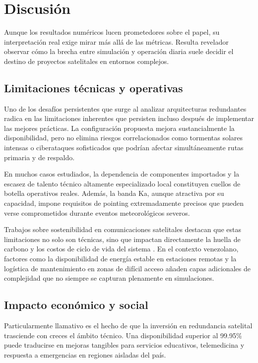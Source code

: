\section{Discusión}

Aunque los resultados numéricos lucen prometedores sobre el papel, su interpretación real exige mirar más allá de las métricas. Resulta revelador observar cómo la brecha entre simulación y operación diaria suele decidir el destino de proyectos satelitales en entornos complejos.

\subsection{Limitaciones técnicas y operativas}

Uno de los desafíos persistentes que surge al analizar arquitecturas redundantes radica en las limitaciones inherentes que persisten incluso después de implementar las mejores prácticas. La configuración propuesta mejora sustancialmente la disponibilidad, pero no elimina riesgos correlacionados como tormentas solares intensas o ciberataques sofisticados que podrían afectar simultáneamente rutas primaria y de respaldo.

En muchos casos estudiados, la dependencia de componentes importados y la escasez de talento técnico altamente especializado local constituyen cuellos de botella operativos reales. Además, la banda Ka, aunque atractiva por su capacidad, impone requisitos de pointing extremadamente precisos que pueden verse comprometidos durante eventos meteorológicos severos. 

Trabajos sobre sostenibilidad en comunicaciones satelitales destacan que estas limitaciones no solo son técnicas, sino que impactan directamente la huella de carbono y los costos de ciclo de vida del sistema \cite{SustainableSat2022}. En el contexto venezolano, factores como la disponibilidad de energía estable en estaciones remotas y la logística de mantenimiento en zonas de difícil acceso añaden capas adicionales de complejidad que no siempre se capturan plenamente en simulaciones.

\subsection{Impacto económico y social}

Particularmente llamativo es el hecho de que la inversión en redundancia satelital trasciende con creces el ámbito técnico. Una disponibilidad superior al 99.95\% puede traducirse en mejoras tangibles para servicios educativos, telemedicina y respuesta a emergencias en regiones aisladas del país. 

